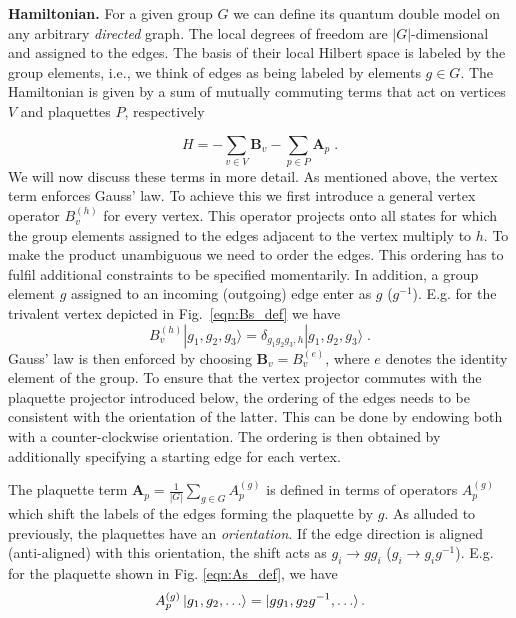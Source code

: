 \documentclass[two column]{article}
\begin{document}
\textbf{Hamiltonian.}
For a given group $G$ we can define its quantum double model on any arbitrary \emph{directed} graph. The local degrees of freedom are $|G|$-dimensional and assigned to the edges. The basis of their local Hilbert space is labeled by the group elements, i.e., we think of edges as being labeled by elements $g\in G$. The Hamiltonian is given by a sum of mutually commuting terms that act on vertices $V$ and plaquettes $P$, respectively




\begin{equation}
    H = -  \sum_{v \in V} \mathbf B_v -  \sum_{p  \in  P} \mathbf A_p \label{eqn:ham} \;.
\end{equation}
We will now discuss these terms in more detail. As mentioned above, the vertex term enforces Gauss' law. To achieve this we first introduce a general vertex operator $B_v^{(h)}$ for every vertex. This operator projects onto all states for which the group elements assigned to the edges adjacent to the vertex multiply to $h$. To make the product unambiguous we need to order the edges. This ordering has to fulfil additional constraints to be specified momentarily. In addition, a group element $g$ assigned to an incoming (outgoing) edge enter as $g$ ($g^{-1}$). E.g. for the trivalent vertex depicted in Fig.~\ref{eqn:Bs_def} we have 
\begin{equation}
B_v^{(h)} |g_1,g_2,g_3\rangle= \delta_{g_1 g_2 g_3,h} |g_1,g_2,g_3\rangle \;.	
\end{equation}
Gauss' law is then enforced by choosing $\mathbf B_v=B^{(e)}_v$, where $e$ denotes the identity element of the group. To ensure that the vertex projector commutes with the plaquette projector introduced below, the ordering of the edges needs to be consistent with the orientation of the latter. This can be done by endowing both with a counter-clockwise orientation. The ordering is then obtained by additionally specifying a starting edge for each vertex.

The plaquette term 
	$\mathbf A_p=\frac{1}{|G|} \sum_{g \in G} A^{(g)}_p$
is defined in terms of operators $A^{(g)}_p$ which shift the labels of the edges forming the plaquette by $g$. As alluded to previously, the plaquettes have an \emph{orientation}. If the edge direction is aligned (anti-aligned) with this orientation, the shift acts as $g_i \rightarrow gg_i$ ($g_i \rightarrow g_ig^{-1}$). E.g. for the plaquette shown in Fig. \ref{eqn:As_def}, we have 
\begin{equation}
	A_p^{(g)}\ket{g_1, g_2, \ldots} = \ket{gg_1, g_2g^{-1}, \ldots}.
\end{equation} 
\end{document}
